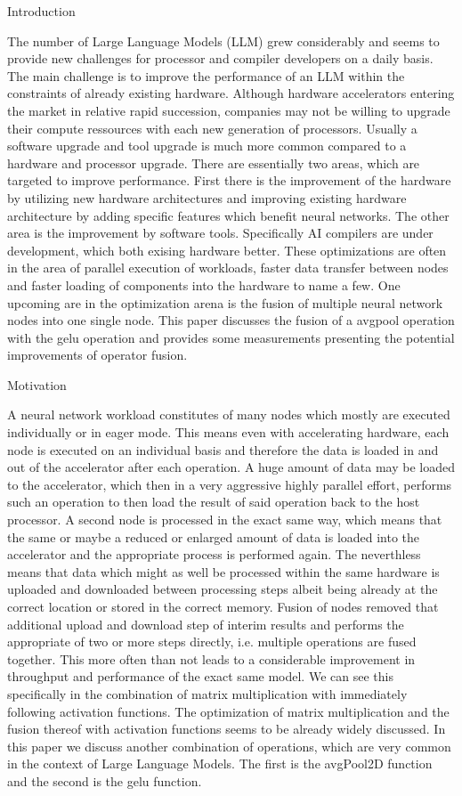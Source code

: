 \documentclass{article}
\begin{document}
Introduction

The number of Large Language Models (LLM) grew considerably and seems to provide new challenges for processor and compiler developers on a daily basis. The main challenge is to improve the performance of an LLM within the constraints of already existing hardware. Although hardware accelerators entering the market in relative rapid succession, companies may not be willing to upgrade their compute ressources with each new generation of processors. Usually a software upgrade and tool upgrade is much more common compared to a hardware and processor upgrade.  
There are essentially two areas, which are targeted to improve performance. First there is the improvement of the hardware by utilizing new hardware architectures and improving existing hardware architecture by adding specific features which benefit neural networks. The other area is the improvement by software tools. Specifically AI compilers are under development, which both exising hardware better. These optimizations are often in the area of parallel execution of workloads, faster data transfer between nodes and faster loading of components into the hardware to name a few. 
One upcoming are in the optimization arena is the fusion of multiple neural network nodes into one single node. This paper discusses the fusion of a avgpool operation with the gelu operation and provides some measurements presenting the potential improvements of operator fusion.

Motivation 

A neural network workload constitutes of many nodes which mostly are executed individually or in eager mode. This means even with accelerating hardware, each node is executed on an individual basis and therefore the data is loaded in and out of the accelerator after each operation. A huge amount of data may be loaded to the accelerator, which then in a very aggressive highly parallel effort, performs such an operation to then load the result of said operation back to the host processor. A second node is processed in the exact same way, which means that the same or maybe a reduced or enlarged amount of data is loaded into the accelerator and the appropriate process is performed again. The neverthless means that data which might as well be processed within the same hardware is uploaded and downloaded between processing steps albeit being already at the correct location or stored in the correct memory.  
Fusion of nodes removed that additional upload and download step of interim results and performs the appropriate of two or more steps directly, i.e. multiple operations are fused together. This more often than not leads to a considerable improvement in throughput and performance of the exact same model. We can see this specifically in the combination of matrix multiplication with immediately following activation functions. The optimization of matrix multiplication and the fusion thereof with activation functions seems to be already widely discussed. In this paper we discuss another combination of operations, which are very common in the context of Large Language Models. The first is the avgPool2D function and the second is the gelu function. 
\end{document}
